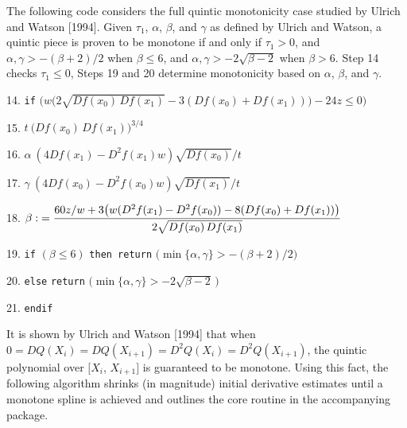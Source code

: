 {\item{} {The following code considers the full quintic monotonicity
case studied by Ulrich and Watson [1994]. Given $\tau_1$, $\alpha$,
$\beta$, and $\gamma$ as defined by Ulrich and Watson, a quintic
piece is proven to be monotone if and only if
$\tau_1 > 0$, and $\alpha, \gamma > -(\beta+2)/2$ when $\beta \leq 6$,
and $\alpha, \gamma > -2 \sqrt{\beta-2}$ when $\beta > 6$.
Step 14 checks $\tau_1 \le 0$, Steps 19 and 20 determine monotonicity based
on $\alpha$, $\beta$, and $\gamma$.}

\item{14.} {\tt if} $\bigl( w\bigl(2\sqrt{Df(x_0)\,Df(x_1)} - 3(Df(x_0) +
  Df(x_1))\bigr) - 24z \leq 0 \bigr)$
\item{} 
\item{15.} $t \: \bigl(Df(x_0)\, Df(x_1)\bigr)^{3/4}$
\item{16.} $\alpha \: (4 Df(x_1) - D^2f(x_1)w) \sqrt{Df(x_0)} / t$
\item{17.} $\gamma \: (4 Df(x_0) - D^2f(x_0)w) \sqrt{Df(x_1)} / t$
\item{18.} $\displaystyle \beta \: {60z/w + 3\bigl(w(D^2f(x_1) -
  D^2f(x_0)) - 8(Df(x_0) + Df(x_1))\bigr) \over 2 \sqrt{Df(x_0)\,Df(x_1)}}$
\item{19.} {\tt if} $(\beta \leq 6)$ {\tt then return}
$\bigl( \min\{\alpha,\gamma\} > - (\beta + 2) / 2 \bigr)$
\item{20.} {\tt else} {\tt return}
$\bigl( \min\{\alpha,\gamma\} > -2 \sqrt{\beta - 2}\,\bigr)$
\item{21.} {\tt endif}
}
\vskip 5mm

It is shown by Ulrich and Watson [1994] that when $0 = DQ(X_i) =
DQ(X_{i+1}) = D^2Q(X_i) = D^2Q(X_{i+1})$, the quintic polynomial
over $[X_i$, $X_{i+1}]$ is guaranteed to be monotone. Using this fact, the
following algorithm shrinks (in magnitude) initial derivative estimates
until a monotone spline is achieved and outlines the core routine in the
accompanying package.

